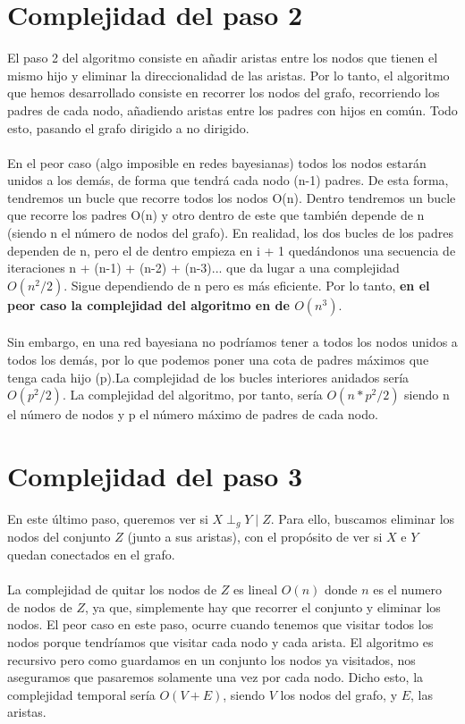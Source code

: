 \documentclass[a4paper,12pt]{article}
\begin{document}
\section{Complejidad del paso 2}
El paso 2 del algoritmo consiste en añadir aristas entre los nodos que tienen el mismo hijo y eliminar la direccionalidad de las aristas. Por lo tanto, el algoritmo que hemos desarrollado consiste en recorrer los nodos del grafo, recorriendo los padres de cada nodo, añadiendo aristas entre los padres con hijos en común. Todo esto, pasando el grafo dirigido a no dirigido. \\ \\
En el peor caso (algo imposible en redes bayesianas) todos los nodos estarán unidos a los demás, de forma que tendrá cada nodo (n-1) padres. De esta forma, tendremos un bucle que recorre todos los nodos O(n). Dentro tendremos un bucle que recorre los padres O(n) y otro dentro de este que también depende de n (siendo n el número de nodos del grafo). En realidad, los dos bucles de los padres dependen de n, pero el de dentro empieza en i + 1 quedándonos una secuencia de iteraciones n + (n-1) + (n-2) + (n-3)... que da lugar a una complejidad $O(n^2/2)$. Sigue dependiendo de n pero es más eficiente. Por lo tanto, \textbf{en el peor caso la complejidad del algoritmo en de $O(n^3)$}. \\ \\ 
Sin embargo, en una red bayesiana no podríamos tener a todos los nodos unidos a todos los demás, por lo que podemos poner una cota de padres máximos que tenga cada hijo (p).La complejidad de los bucles interiores anidados sería $O(p^2/2)$. La complejidad del algoritmo, por tanto, sería $O(n * p^2/2)$ siendo n el número de nodos y p el número máximo de padres de cada nodo.
 
\section{Complejidad del paso 3}
En este último paso, queremos ver si  $X \perp _g Y \mid Z$. Para ello, buscamos eliminar los nodos del conjunto $Z$ (junto a sus aristas), con el propósito de ver si $X$ e $Y$ quedan conectados en el grafo. \\ \\
La complejidad de quitar los nodos de $Z$ es lineal $O(n)$ donde $n$ es el numero de nodos de $Z$, ya que, simplemente hay que recorrer el conjunto y eliminar los nodos.
El peor caso en este paso, ocurre cuando tenemos que visitar todos los nodos porque tendríamos que visitar cada nodo y cada arista. El algoritmo es recursivo pero como guardamos en un conjunto los nodos ya visitados, nos aseguramos que pasaremos solamente una vez por cada nodo. Dicho esto, la complejidad temporal sería  $O(V + E)$, siendo $V$ los nodos del grafo, y $E$, las aristas.
\end{document}
